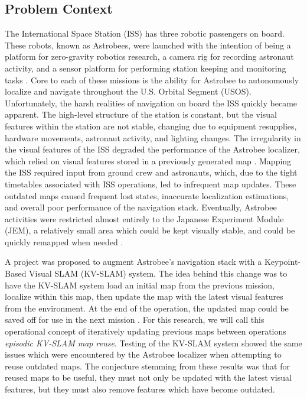\subsection{Problem Context}


The International Space Station (ISS) has three robotic passengers on board. These robots, known as Astrobees, were launched with the intention of being a platform for zero-gravity robotics research, a camera rig for recording astronaut activity, and a sensor platform for performing station keeping and monitoring tasks \cite{smithASTROBEENEWPLATFORM}. Core to each of these missions is the ability for Astrobee to autonomously localize and navigate throughout the U.S. Orbital Segment (USOS). Unfortunately, the harsh realities of navigation on board the ISS quickly became apparent. The high-level structure of the station is constant, but the visual features within the station are not stable, changing due to equipment resupplies, hardware movements, astronaut activity, and lighting changes. The irregularity in the visual features of the ISS degraded the performance of the Astrobee localizer, which relied on visual features stored in a previously generated map \cite{soussanAstroLocEfficientRobust2022}. Mapping the ISS required input from ground crew and astronauts, which, due to the tight timetables associated with ISS operations, led to infrequent map updates. These outdated maps caused frequent lost states, inaccurate localization estimations, and overall poor performance of the navigation stack. Eventually, Astrobee activities were restricted almost entirely to the Japanese Experiment Module (JEM), a relatively small area which could be kept visually stable, and could be quickly remapped when needed \cite{carlinoLessonsLearnedAstrobee}.

A project was proposed to augment Astrobee's navigation stack with a Keypoint-Based Visual SLAM (KV-SLAM) system. The idea behind this change was to have the KV-SLAM system load an initial map from the previous mission, localize within this map, then update the map with the latest visual features from the environment. At the end of the operation, the updated map could be saved off for use in the next mission \cite{zuralesCollaborativeSensingMapping2024}. For this research, we will call this operational concept of iteratively updating previous maps between operations \textit{episodic KV-SLAM map reuse}. Testing of the KV-SLAM system showed the same issues which were encountered by the Astrobee localizer when attempting to reuse outdated maps. The conjecture stemming from these results was that for reused maps to be useful, they must not only be updated with the latest visual features, but they must also remove features which have become outdated.

